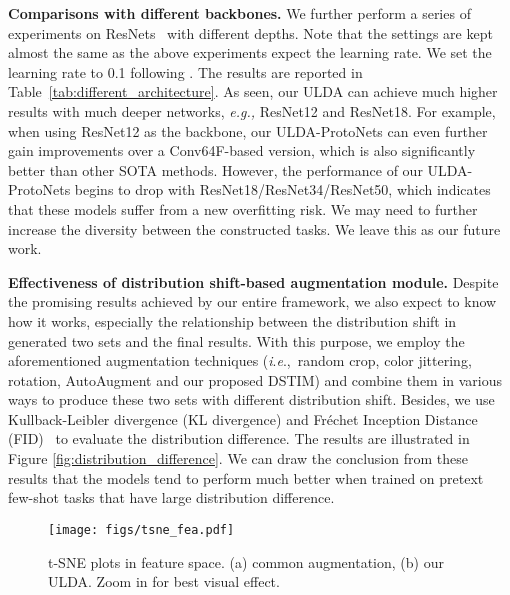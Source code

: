 \documentclass[letterpaper]{article} \usepackage{aaai21}  \usepackage{times}  \usepackage{helvet} \usepackage{courier}  \usepackage[hyphens]{url}  \usepackage{graphicx} \urlstyle{rm} \def\UrlFont{\rm}  \usepackage{natbib}  \usepackage{caption} \usepackage{url}
\newcommand{\ie}{\textit{i}.\textit{e}.,}
\begin{document}
\noindent\textbf{Comparisons with different backbones.}
We further perform a series of experiments on ResNets~\cite{He2016ResNet} with different depths. Note that the settings are kept almost the same as the above experiments expect the learning rate. We set the learning rate to 0.1 following \cite{LeeCVPR2019meta}. The results are reported in Table~\ref{tab:different_architecture}. As seen, our ULDA can achieve much higher results with much deeper networks, \textit{e.g.,} ResNet12 and ResNet18. For example, when using ResNet12 as the backbone, our ULDA-ProtoNets can even further gain  improvements over a Conv64F-based version, which is also significantly better than other SOTA methods.
However, the performance of our ULDA-ProtoNets begins to drop with ResNet18/ResNet34/ResNet50, which indicates that these models suffer from a new overfitting risk. We may need to further increase the diversity between the constructed tasks. We leave this as our future work. 



\noindent\textbf{Effectiveness of distribution shift-based augmentation module.} Despite the promising results achieved by our entire framework, we also expect to know how it works, especially the relationship between the distribution shift in generated two sets and the final results.
With this purpose, we employ the aforementioned augmentation techniques (\ie~random crop, color jittering, rotation, AutoAugment and our proposed DSTIM) and combine them in various ways to produce these two sets with different distribution shift. Besides, we use Kullback-Leibler divergence (KL divergence) and Fr\'echet Inception Distance (FID)~\cite{Heusel2017NIPS} to evaluate the distribution difference. The results are illustrated in Figure \ref{fig:distribution_difference}.
We can draw the conclusion from these results that the models tend to perform much better when trained on pretext few-shot tasks that have large distribution difference. 





\begin{figure}[!tbp]
\centering
\texttt{[image: figs/tsne\_fea.pdf]}
\vspace{-0.3cm}
\caption{t-SNE plots in feature space. (a) common augmentation, (b) our ULDA. Zoom in for best visual effect.}
\label{fig:tsne_fea}
\vspace{-0.2cm}
\end{figure}
\end{document}
